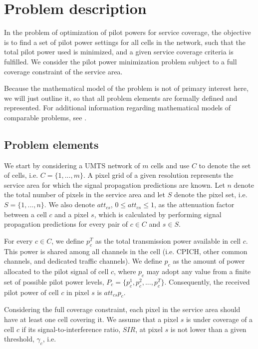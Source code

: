 \section{Problem description}

In the problem of optimization of pilot powers for service coverage,
the objective is to find a set of pilot power settings for all cells
in the network, such that the total pilot power used is minimized,
and a given service coverage criteria is fulfilled. We consider the
pilot power minimization problem subject to a full coverage constraint
of the service area.

Because the mathematical model of the problem is not of primary interest
here, we will just outline it, so that all problem elements are formally
defined and represented. For additional information regarding mathematical
models of comparable problems, see \cite{Nawrocki_Understanding:2006}.


\subsection{Problem elements}

We start by considering a UMTS network of $m$ cells and use $C$
to denote the set of cells, i.e. $C=\{1,...,m\}$. A pixel grid of
a given resolution represents the service area for which the signal
propagation predictions are known. Let $n$ denote the total number
of pixels in the service area and let $S$ denote the pixel set, i.e.
$S=\{1,...,n\}$. We also denote $att_{cs}$, $0\le att_{cs}\le1$,
as the attenuation factor between a cell $c$ and a pixel $s$, which
is calculated by performing signal propagation predictions for every
pair of $c\in C$ and $s\in S$.

For every $c\in C$, we define $p_{c}^{T}$ as the total transmission
power available in cell $c$. This power is shared among all channels
in the cell (i.e. CPICH, other common channels, and dedicated traffic
channels). We define $p_{c}$ as the amount of power allocated to
the pilot signal of cell $c$, where $p_{c}$ may adopt any value
from a finite set of possible pilot power levels, $P_{c}=\{p_{c}^{1},p_{c}^{2},...,p_{c}^{T}\}$.
Consequently, the received pilot power of cell $c$ in pixel $s$
is $att_{cs}p_{c}$.

Considering the full coverage constraint, each pixel in the service
area should have at least one cell covering it. We assume that a pixel
$s$ is under coverage of a cell $c$ if its signal-to-interference
ratio, $SIR$, at pixel $s$ is not lower than a given threshold,
$\gamma_{c}$, i.e.

